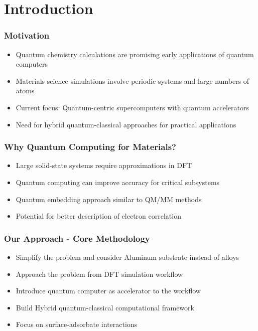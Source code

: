 \section{Introduction}

\begin{frame}
\frametitle{Motivation}
\begin{itemize}
    \item Quantum chemistry calculations are promising early applications of quantum computers
    \item Materials science simulations involve periodic systems and large numbers of atoms
    \item Current focus: Quantum-centric supercomputers with quantum accelerators
    \item Need for hybrid quantum-classical approaches for practical applications
\end{itemize}
\end{frame}

\begin{frame}
\frametitle{Why Quantum Computing for Materials?}
\begin{itemize}
    \item Large solid-state systems require approximations in DFT
    \item Quantum computing can improve accuracy for critical subsystems
    \item Quantum embedding approach similar to QM/MM methods
    \item Potential for better description of electron correlation
\end{itemize}
\end{frame}

\begin{frame}
\frametitle{Our Approach - Core Methodology}
\begin{itemize}
    \item Simplify the problem and consider Aluminum substrate instead of alloys
    \item Approach the problem from DFT simulation workflow
    \item Introduce quantum computer as accelerator to the workflow
    \item Build Hybrid quantum-classical computational framework
    \item Focus on surface-adsorbate interactions
\end{itemize}
\end{frame}

